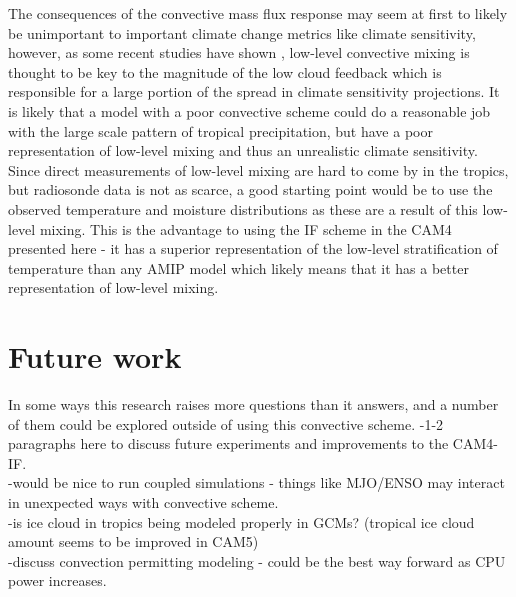\documentclass[letterpaper,12pt,titlepage,oneside,final]{book}
\let\origdoublepage\cleardoublepage
\newcommand{\clearemptydoublepage}{%
  \clearpage{\pagestyle{empty}\origdoublepage}}
\let\cleardoublepage\clearemptydoublepage
\begin{document}
The consequences of the convective mass flux response may seem at first to likely be unimportant to important climate change metrics like climate sensitivity, however, as some recent studies have shown \citep{sherwood_spread_2014,brient_shallowness_2016}, low-level convective mixing is thought to be key to the magnitude of the low cloud feedback which is responsible for a large portion of the spread in climate sensitivity projections. It is likely that a model with a poor convective scheme could do a reasonable job with the large scale pattern of tropical precipitation, but have a poor representation of low-level mixing and thus an unrealistic climate sensitivity. Since direct measurements of low-level mixing are hard to come by in the tropics, but radiosonde data is not as scarce, a good starting point would be to use the observed temperature and moisture distributions as these are a result of this low-level mixing. This is the advantage to using the IF scheme in the CAM4 presented here - it has a superior representation of the low-level stratification of temperature than any AMIP model which likely means that it has a better representation of low-level mixing.
\section{Future work}
In some ways this research raises more questions than it answers, and a number of them could be explored outside of using this convective scheme.
-1-2 paragraphs here to discuss future experiments and improvements to the CAM4-IF.
\\
-would be nice to run coupled simulations - things like MJO/ENSO may interact in unexpected ways with convective scheme.
\\
-is ice cloud in tropics being modeled properly in GCMs? (tropical ice cloud amount seems to be improved in CAM5)
\\
-discuss convection permitting modeling - could be the best way forward as CPU power increases.
\\




\cleardoublepage %
\renewcommand*{\bibname}{References}
\end{document}
